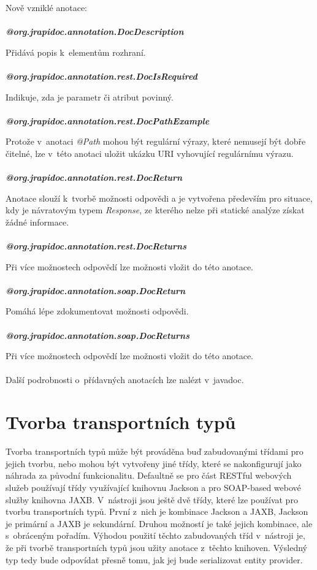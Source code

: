\documentclass[11pt,twoside,a4paper]{book}
\begin{document}
Nově vzniklé anotace:
\mbox{}\\
\mbox{}\\
\textbf{\textit{@org.jrapidoc.annotation.DocDescription}}

Přidává popis k~elementům rozhraní.
\mbox{}\\
\mbox{}\\
\textbf{\textit{@org.jrapidoc.annotation.rest.DocIsRequired}}

Indikuje, zda je parametr či atribut povinný.
\mbox{}\\
\mbox{}\\
\textbf{\textit{@org.jrapidoc.annotation.rest.DocPathExample}}

Protože v~anotaci {\em @Path} mohou být regulární výrazy, které nemusejí být dobře čitelné, lze
v~této anotaci uložit ukázku URI vyhovující regulárnímu výrazu.
\mbox{}\\
\mbox{}\\
\textbf{\textit{@org.jrapidoc.annotation.rest.DocReturn}}

Anotace slouží k~tvorbě možnosti odpovědi a je vytvořena především pro situace, kdy je
návratovým typem {\em Response}, ze kterého nelze při statické analýze získat žádné informace.
\mbox{}\\
\mbox{}\\
\textbf{\textit{@org.jrapidoc.annotation.rest.DocReturns}}

Při více možnostech odpovědí lze možnosti vložit do této anotace.
\mbox{}\\
\mbox{}\\
\textbf{\textit{@org.jrapidoc.annotation.soap.DocReturn}}

Pomáhá lépe zdokumentovat možnosti odpovědi.
\mbox{}\\
\mbox{}\\
\textbf{\textit{@org.jrapidoc.annotation.soap.DocReturns}}

Při více možnostech odpovědí lze možnosti vložit do této anotace.
\mbox{}\\
\mbox{}\\
Další podrobnosti o~přídavných anotacích lze nalézt v~javadoc.

\section{Tvorba transportních typů}

Tvorba transportních typů může být prováděna buď zabudovanými třídami pro jejich
tvorbu, nebo mohou být vytvořeny jiné třídy, které se nakonfigurují jako náhrada
za původní funkcionalitu. Defaultně se pro část RESTful webových služeb
používají třídy využívající knihovnu Jackson a pro SOAP-based webové služby
knihovna JAXB. V~nástroji jsou ještě dvě třídy, které lze používat pro tvorbu
transportních typů. První z~nich je kombinace Jackson a JAXB, Jackson je
primární a JAXB je sekundární. Druhou možností je také jejich kombinace, ale
s~obráceným pořadím. Výhodou použití těchto zabudovaných tříd v~nástroji je, že
při tvorbě transportních typů jsou užity anotace z~těchto knihoven. Výsledný typ
tedy bude odpovídat přesně tomu, jak jej bude serializovat entity provider. 
\end{document}

